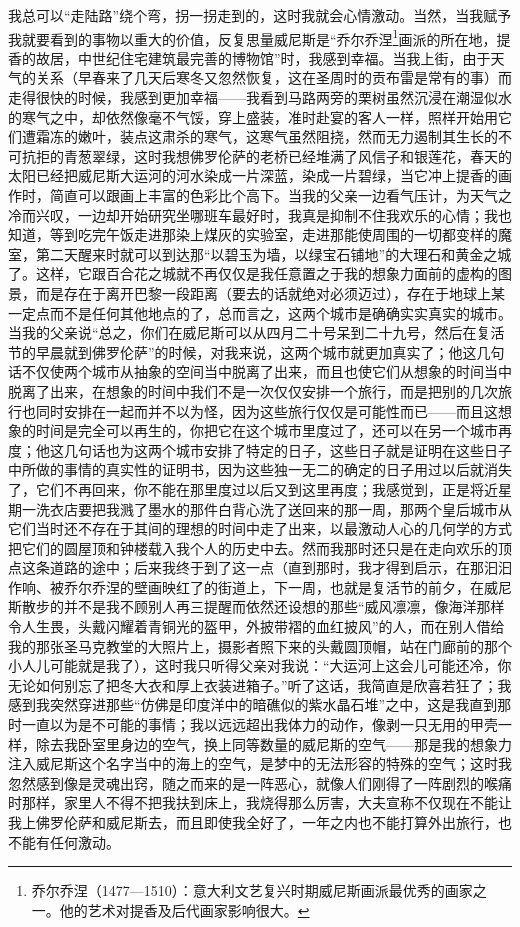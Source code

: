 我总可以“走陆路”绕个弯，拐一拐走到的，这时我就会心情激动。当然，当我赋予我就要看到的事物以重大的价值，反复思量威尼斯是“乔尔乔涅\footnote{乔尔乔涅（1477—1510）：意大利文艺复兴时期威尼斯画派最优秀的画家之一。他的艺术对提香及后代画家影响很大。}画派的所在地，提香的故居，中世纪住宅建筑最完善的博物馆”时，我感到幸福。当我上街，由于天气的关系（早春来了几天后寒冬又忽然恢复，这在圣周时的贡布雷是常有的事）而走得很快的时候，我感到更加幸福——我看到马路两旁的栗树虽然沉浸在潮湿似水的寒气之中，却依然像毫不气馁，穿上盛装，准时赴宴的客人一样，照样开始用它们遭霜冻的嫩叶，装点这肃杀的寒气，这寒气虽然阻挠，然而无力遏制其生长的不可抗拒的青葱翠绿，这时我想佛罗伦萨的老桥已经堆满了风信子和银莲花，春天的太阳已经把威尼斯大运河的河水染成一片深蓝，染成一片碧绿，当它冲上提香的画作时，简直可以跟画上丰富的色彩比个高下。当我的父亲一边看气压计，为天气之冷而兴叹，一边却开始研究坐哪班车最好时，我真是抑制不住我欢乐的心情；我也知道，等到吃完午饭走进那染上煤灰的实验室，走进那能使周围的一切都变样的魔室，第二天醒来时就可以到达那“以碧玉为墙，以绿宝石铺地”的大理石和黄金之城了。这样，它跟百合花之城就不再仅仅是我任意置之于我的想象力面前的虚构的图景，而是存在于离开巴黎一段距离（要去的话就绝对必须迈过），存在于地球上某一定点而不是任何其他地点的了，总而言之，这两个城市是确确实实真实的城市。当我的父亲说“总之，你们在威尼斯可以从四月二十号呆到二十九号，然后在复活节的早晨就到佛罗伦萨”的时候，对我来说，这两个城市就更加真实了；他这几句话不仅使两个城市从抽象的空间当中脱离了出来，而且也使它们从想象的时间当中脱离了出来，在想象的时间中我们不是一次仅仅安排一个旅行，而是把别的几次旅行也同时安排在一起而并不以为怪，因为这些旅行仅仅是可能性而已——而且这想象的时间是完全可以再生的，你把它在这个城市里度过了，还可以在另一个城市再度；他这几句话也为这两个城市安排了特定的日子，这些日子就是证明在这些日子中所做的事情的真实性的证明书，因为这些独一无二的确定的日子用过以后就消失了，它们不再回来，你不能在那里度过以后又到这里再度；我感觉到，正是将近星期一洗衣店要把我溅了墨水的那件白背心洗了送回来的那一周，那两个皇后城市从它们当时还不存在于其间的理想的时间中走了出来，以最激动人心的几何学的方式把它们的圆屋顶和钟楼载入我个人的历史中去。然而我那时还只是在走向欢乐的顶点这条道路的途中；后来我终于到了这一点（直到那时，我才得到启示，在那汩汩作响、被乔尔乔涅的壁画映红了的街道上，下一周，也就是复活节的前夕，在威尼斯散步的并不是我不顾别人再三提醒而依然还设想的那些“威风凛凛，像海洋那样令人生畏，头戴闪耀着青铜光的盔甲，外披带褶的血红披风”的人，而在别人借给我的那张圣马克教堂的大照片上，摄影者照下来的头戴圆顶帽，站在门廊前的那个小人儿可能就是我了），这时我只听得父亲对我说：“大运河上这会儿可能还冷，你无论如何别忘了把冬大衣和厚上衣装进箱子。”听了这话，我简直是欣喜若狂了；我感到我突然穿进那些“仿佛是印度洋中的暗礁似的紫水晶石堆”之中，这是我直到那时一直以为是不可能的事情；我以远远超出我体力的动作，像剥一只无用的甲壳一样，除去我卧室里身边的空气，换上同等数量的威尼斯的空气——那是我的想象力注入威尼斯这个名字当中的海上的空气，是梦中的无法形容的特殊的空气；这时我忽然感到像是灵魂出窍，随之而来的是一阵恶心，就像人们刚得了一阵剧烈的喉痛时那样，家里人不得不把我扶到床上，我烧得那么厉害，大夫宣称不仅现在不能让我上佛罗伦萨和威尼斯去，而且即使我全好了，一年之内也不能打算外出旅行，也不能有任何激动。
